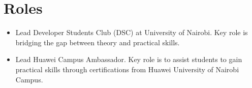 \documentclass[letterpaper,11pt]{article}
\begin{document}
\section{Roles}
\begin{itemize}[noitemsep]
    \item Lead Developer Students Club (DSC) at University of Nairobi. Key role is bridging the gap between theory and practical skills.
    \item Lead Huawei Campus Ambassador. Key role is to assist students to gain practical skills through certifications from Huawei University of Nairobi Campus.
\end{itemize}


\end{document}
